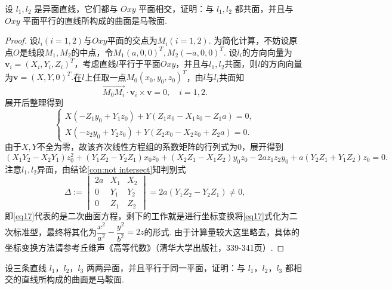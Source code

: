 \documentclass[12pt, a4paper,newtx]{ctexart}
\begin{document}
\begin{property}{}{}
	设 $l_1,l_2$ 是异面直线，它们都与 $Oxy$ 平面相交，证明：与 $l_1,l_2$ 都共面，并且与 $Oxy$ 平面平行的直线所构成的曲面是马鞍面. 
\end{property}
\begin{proof}
	设$l_i(i=1,2)$与$Oxy$平面的交点为$M_i(i=1,2).$ 为简化计算，不妨设原点$O$是线段$M_1,M_2$的中点，令$M_1(a,0,0)^T,M_2(-a,0,0)^T.$ 设$l_i$的方向向量为$\bm v_i=(X_i,Y_i,Z_i)^T$，考虑直线$l$平行于平面$Oxy$，并且与$l_1,l_2$共面，则$l$的方向向量为$\bm v=(X,Y,0)^T.$在$l$上任取一点$M_0(x_0,y_0,z_0)^T$，由$l$与$l_i$共面知\begin{equation}
		\overrightarrow{M_0M_i}\cdot\bm v_i\times\bm v=0,\quad i=1,2.
	\end{equation}
	展开后整理得到\begin{equation}
		\begin{cases}
			X\left(-Z_1y_0+Y_1z_0\right)+Y\left(Z_1x_0-X_1z_0-Z_1a\right)=0,\\X\left(-z_2y_0+Y_2z_0\right)+Y\left(Z_2x_0-X_2z_0+Z_2a\right)=0.
		\end{cases}
	\end{equation}
	由于$X,Y$不全为零，故该齐次线性方程组的系数矩阵的行列式为0，展开得到\begin{equation}\label{eq17}
		\left(X_1Y_2-X_2Y_1\right)z_0^2+\left(Y_1Z_2-Y_2Z_1\right)x_0z_0+\left(X_2Z_1-X_1Z_2\right)y_0z_0-2az_1z_2y_0+a\left(Y_2Z_1+Y_1Z_2\right)z_0=0.
	\end{equation}
	注意$l_1,l_2$异面，由结论\ref{con:not intersect}知判别式\[\Delta:=\begin{vmatrix}
		2a&X_1&X_2\\0&Y_1&Y_2\\0&Z_1&Z_2
	\end{vmatrix}=2a\left(Y_1Z_2-Y_2Z_1\right)\ne0,\]
	即\eqref{eq17}代表的是二次曲面方程，剩下的工作就是进行坐标变换将\eqref{eq17}式化为二次标准型，最终将其化为$\dfrac{x^2}{a^2}-\dfrac{y^2}{b^2}=2z$的形式. 由于计算量较大这里略去，具体的坐标变换方法请参考丘维声《高等代数》（清华大学出版社，339-341页）. 
\end{proof}
\begin{property}{}{}
	设三条直线 $l_1$，$l_2$，$l_3$ 两两异面，并且平行于同一平面，证明：与 $l_1$，$l_2$，$l_3$ 都相交的直线所构成的曲面是马鞍面. 
\end{property}
\end{document}

